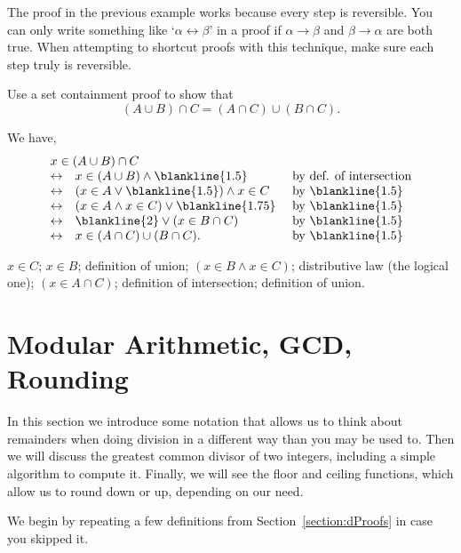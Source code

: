 \begin{rem}
The proof in the previous example works because every step is reversible.
You can only write something like `$\alpha\leftrightarrow \beta$' in a proof if 
$\alpha\rightarrow\beta$ and $\beta\rightarrow\alpha$ are both true.
When attempting to shortcut proofs with this technique, make sure each step truly is
reversible.
\end{rem}

\begin{fib}\label{setpf3}
Use a  set containment proof to show that 
$$(A \cup B) \cap C = (A \cap C) \cup (B \cap C).$$
\begin{sol} We have, 
$$\begin{array}{lll}
\multicolumn{2}{l}{x \in (A \cup B) \cap C}\\
\leftrightarrow  & x\in (A \cup B) \wedge \blankline{1.5}&\mbox{ by def. of intersection}\\
\leftrightarrow & (x\in A\vee \blankline{1.5}) \wedge x\in C &\mbox{ by \blankline{1.5}}\\
\leftrightarrow & (x\in A\wedge x\in C) \vee \blankline{1.75}&\mbox{ by  \blankline{1.5}}\\
\leftrightarrow & \blankline{2}\vee (x\in B \cap C)&\mbox{ by \blankline{1.5}}\\
\leftrightarrow & x \in (A \cap C) \cup (B \cap C).&\mbox{ by \blankline{1.5}}
\end{array}$$
\end{sol}
\begin{answer}
$x\in C$; 
$x\in B$;
definition of union;
$(x\in B \wedge x\in C)$;
distributive law (the logical one);
$(x\in A\cap C) $;
definition of intersection;
definition of union.
\end{answer}
\end{fib}

\newpage
\section{Modular Arithmetic, GCD, Rounding}\label{section:moddiv}

In this section we introduce some notation
that allows us to think about remainders when doing division 
in a different way than you may be used to. 
Then we will discuss the greatest common divisor of two integers,
including a simple algorithm to compute it.
Finally, we will see the floor and ceiling functions, which allow
us to round down or up, depending on our need.

We begin by repeating a few definitions from Section~\ref{section:dProofs} in case
you skipped it.

